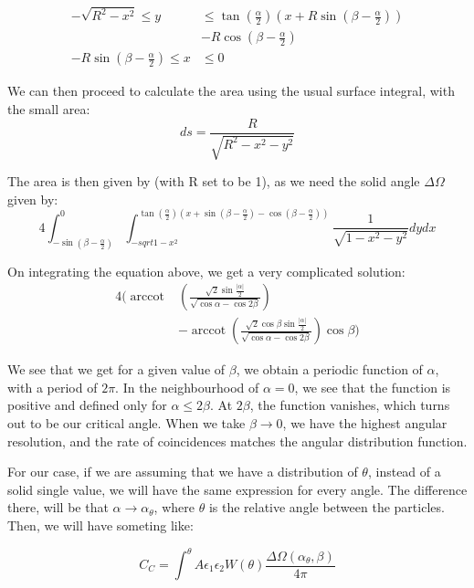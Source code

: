 \documentclass{double}
\DeclareMathOperator{\arccot}{arccot}
\begin{document}
\begin{multicols*}{2}
\begin{align}
    -\sqrt{R^2-x^2} \leq y &\leq
    \tan(\frac{\alpha}{2})(x+R\sin(\beta-\frac{\alpha}{2}))
    \nonumber\\
    &- R\cos(\beta-\frac{\alpha}{2}) \\
    - R\sin(\beta-\frac{\alpha}{2}) \leq x &\leq 0
\end{align}

We can then proceed to calculate the area using the usual
surface integral, with the small area:
\begin{equation}
    ds = \frac{R}{\sqrt{R^2-x^2-y^2}}
\end{equation}

The area is then given by (with R set to be 1), as we need
the solid angle $\Delta \Omega$ given by:
\begin{equation}
    4\int_{-\sin(\beta-\frac{\alpha}{2})}^{0}
    \int_{-sqrt{1-x^2}}^{\tan(\frac{\alpha}{2})(x+\sin(\beta -
    \frac{\alpha}{2}) - \cos(\beta -\frac{\alpha}{2}))}
    \frac{1}{\sqrt{1-x^2-y^2}} dy dx
\end{equation}

On integrating the equation above, we get a very complicated
solution:
\begin{align}
    4(\arccot&\left(\frac{\sqrt{2}\sin\frac{\left|\alpha\right|}{2}}{\sqrt{\cos\alpha-\cos2\beta}}\right)
    \nonumber \\&-\arccot\left(\frac{\sqrt{2}\cos\beta\sin\frac{\left|\alpha\right|}{2}}{\sqrt{\cos\alpha-\cos2\beta}}\right)
    \cos\beta)
    \label{eq:delom}
\end{align}

We see that we get for a given value of $\beta$, we obtain a
periodic function of $\alpha$, with a period of $2\pi$. In
the neighbourhood of $\alpha=0$, we see that the function is
positive and defined only for $\alpha \leq 2\beta$. At
$2\beta$, the function vanishes, which turns out to be our
critical angle. When we take $\beta \rightarrow 0$, we have
the highest angular resolution, and the rate of coincidences
matches the angular distribution function.

For our case, if we are assuming that we have a distribution
of $\theta$, instead of a solid single value, we will have
the same expression for every angle. The difference there,
will be that $\alpha \rightarrow \alpha_\theta$, where
$\theta$ is the relative angle between the particles. Then,
we will have someting like:

\begin{equation}
    \boxed{
        C_C = \int^{\theta} A\epsilon_1\epsilon_2 W(\theta) \frac{\Delta
        \Omega(\alpha_\theta, \beta)}{4\pi}
    }
\end{equation}


\end{multicols*}
\end{document}
